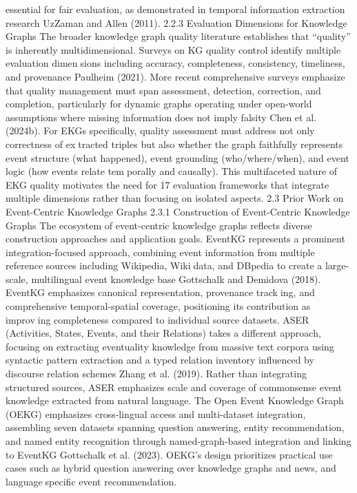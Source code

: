 essential for fair evaluation, as demonstrated in temporal information extraction research
UzZaman and Allen (2011).
2.2.3 Evaluation Dimensions for Knowledge Graphs
The broader knowledge graph quality literature establishes that “quality” is inherently
multidimensional. Surveys on KG quality control identify multiple evaluation dimensions including accuracy, completeness, consistency, timeliness, and provenance Paulheim
(2021). More recent comprehensive surveys emphasize that quality management must
span assessment, detection, correction, and completion, particularly for dynamic graphs
operating under open-world assumptions where missing information does not imply falsity
Chen et al. (2024b).
For EKGs specifically, quality assessment must address not only correctness of extracted triples but also whether the graph faithfully represents event structure (what
happened), event grounding (who/where/when), and event logic (how events relate temporally and causally). This multifaceted nature of EKG quality motivates the need for
17
evaluation frameworks that integrate multiple dimensions rather than focusing on isolated
aspects.
2.3 Prior Work on Event-Centric Knowledge Graphs
2.3.1 Construction of Event-Centric Knowledge Graphs
The ecosystem of event-centric knowledge graphs reflects diverse construction approaches
and application goals. EventKG represents a prominent integration-focused approach,
combining event information from multiple reference sources including Wikipedia, Wikidata, and DBpedia to create a large-scale, multilingual event knowledge base Gottschalk
and Demidova (2018). EventKG emphasizes canonical representation, provenance tracking, and comprehensive temporal-spatial coverage, positioning its contribution as improving completeness compared to individual source datasets.
ASER (Activities, States, Events, and their Relations) takes a different approach,
focusing on extracting eventuality knowledge from massive text corpora using syntactic
pattern extraction and a typed relation inventory influenced by discourse relation schemes
Zhang et al. (2019). Rather than integrating structured sources, ASER emphasizes scale
and coverage of commonsense event knowledge extracted from natural language.
The Open Event Knowledge Graph (OEKG) emphasizes cross-lingual access and
multi-dataset integration, assembling seven datasets spanning question answering, entity
recommendation, and named entity recognition through named-graph-based integration
and linking to EventKG Gottschalk et al. (2023). OEKG’s design prioritizes practical use
cases such as hybrid question answering over knowledge graphs and news, and languagespecific event recommendation.
